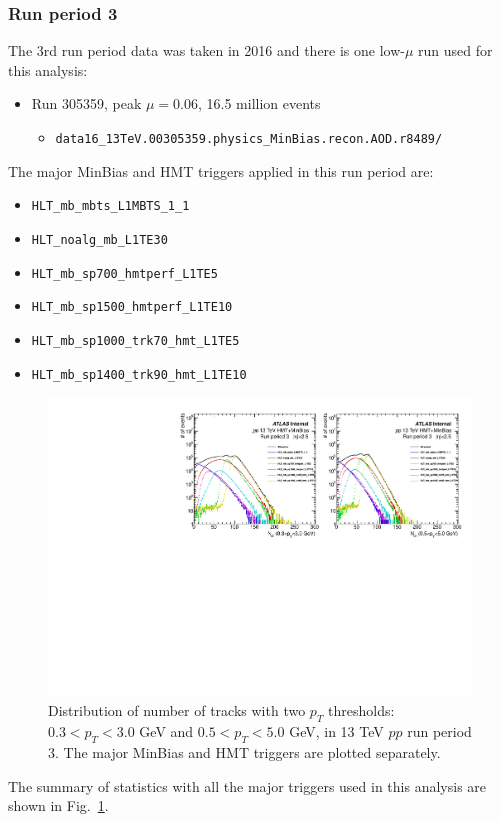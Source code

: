 \subsubsection{Run period 3}
The 3rd run period data was taken in 2016 and there is one low-$\mu$ run used for this analysis:
\begin{itemize}

\item Run 305359, peak $\mu=0.06$, 16.5 million events
\begin{itemize}[leftmargin=*]
\item[] \verb|data16_13TeV.00305359.physics_MinBias.recon.AOD.r8489/|
\end{itemize}

\end{itemize}
The major MinBias and HMT triggers applied in this run period are:
\begin{itemize}
\item \verb|HLT_mb_mbts_L1MBTS_1_1|
\item \verb|HLT_noalg_mb_L1TE30|
\item \verb|HLT_mb_sp700_hmtperf_L1TE5|
\item \verb|HLT_mb_sp1500_hmtperf_L1TE10|
\item \verb|HLT_mb_sp1000_trk70_hmt_L1TE5|
\item \verb|HLT_mb_sp1400_trk90_hmt_L1TE10|
\end{itemize}

\begin{figure}[H]
\centering
\includegraphics[width=.9\linewidth]{figs/sec_evtSlc/trkDis_pp13_run3.pdf}
\caption{Distribution of number of tracks with two $p_{T}$ thresholds: $0.3<p_{T}<3.0$ GeV and $0.5<p_{T}<5.0$ GeV, in 13 TeV $pp$ run period 3. The major MinBias and HMT triggers are plotted separately.}
\label{fig:trkDis_pp13_run3}
\end{figure}
The summary of statistics with all the major triggers used in this analysis are shown in Fig.~\ref{fig:trkDis_pp13_run3}.

